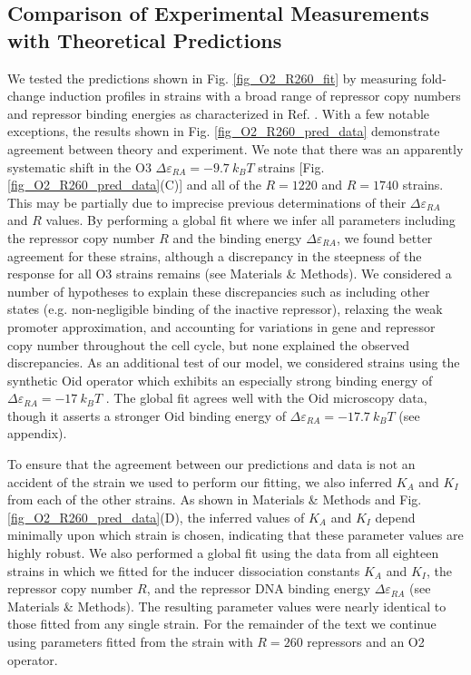 \subsection{Comparison of Experimental Measurements with Theoretical
Predictions}

We tested the predictions shown in Fig. \ref{fig_O2_R260_fit} by measuring
fold-change induction profiles in strains with a broad range of repressor copy
numbers and repressor binding energies as characterized in
Ref. \cite{Garcia2011}. With a few notable exceptions, the results shown in
Fig. \ref{fig_O2_R260_pred_data} demonstrate agreement between theory and
experiment. We note  that there was an apparently systematic shift in the O3
$\Delta\varepsilon_{RA} = -9.7\ k_BT$ strains
[Fig. \ref{fig_O2_R260_pred_data}(C)] and all of the $R=1220$ and $R =1740$
strains. This may be partially due to imprecise previous determinations of their
$\Delta\varepsilon_{RA}$ and $R$ values. By performing a global fit where we
infer all parameters including the repressor copy number $R$ and the binding
energy $\Delta\varepsilon_{RA}$, we found better agreement for these strains,
although a discrepancy in the steepness of the response for all O3 strains
remains (see Materials \& Methods).
We considered a number of hypotheses to explain these discrepancies such as
including other states (e.g. non-negligible binding of the inactive repressor),
relaxing the weak promoter approximation, and accounting for variations in gene
and repressor copy number throughout the cell cycle, but none explained the
observed discrepancies. As an additional test of our model, we considered
strains using the synthetic Oid operator which exhibits an especially strong
binding energy of $\Delta\varepsilon_{RA}=-17~k_B T$ \cite{Garcia2011}. The
global fit agrees well with the Oid microscopy data, though it asserts a
stronger Oid binding energy of $\Delta\varepsilon_{RA}=-17.7~k_B T$ (see appendix).

To ensure that the agreement between our predictions and data is not an accident
of the strain we used to perform our fitting, we also inferred $K_A$ and $K_I$
from each of the other strains. As shown in Materials \& Methods
and Fig. \ref{fig_O2_R260_pred_data}(D), the inferred values of $K_A$ and $K_I$
depend minimally upon which strain is chosen, indicating that these parameter
values are highly robust. We also performed a global fit using the data from all
eighteen strains in which we fitted for the inducer dissociation constants $K_A$
and $K_I$, the repressor copy number $R$, and the repressor DNA binding energy
$\Delta\varepsilon_{RA}$ (see Materials \& Methods). The resulting parameter values were nearly
identical to those fitted from any single strain. For the remainder of the text
we continue using parameters fitted from the strain with $R=260$ repressors and
an O2 operator.

